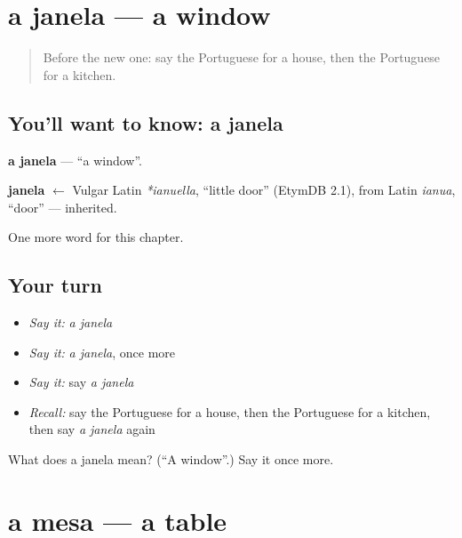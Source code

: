 \section[a janela]{a janela — a window}

\label{lesson:PT-C48-janela}



\begin{quote}
Before the new one: say the Portuguese for a house, then the Portuguese for a kitchen.
\end{quote}

\subsection*{You'll want to know: a janela}
\textbf{a janela} — \textquotedblleft{}a window\textquotedblright{}.

\begin{cousinweb}
\textbf{janela} $\leftarrow$ Vulgar Latin \emph{*ianuella}, \textquotedblleft{}little door\textquotedblright{} (EtymDB 2.1), from Latin \emph{ianua}, \textquotedblleft{}door\textquotedblright{} — inherited.
\end{cousinweb}

\begin{grammarlens}[title={What you've built}]
One more word for this chapter.
\end{grammarlens}

\subsection*{Your turn}
\begin{itemize}
\raggedright
  \item \emph{Say it:} \emph{a janela}
  \item \emph{Say it:} \emph{a janela}, once more
  \item \emph{Say it:} say \emph{a janela}
  \item \emph{Recall:} say the Portuguese for a house, then the Portuguese for a kitchen, then say \emph{a janela} again
\end{itemize}

\begin{tcolorbox}[breakable,colback=teal!4,colframe=teal!35!black,title={Before you move on}]
What does a janela mean? (\textquotedblleft{}A window\textquotedblright{}.) Say it once more.
\end{tcolorbox}
\section[a mesa]{a mesa — a table}

